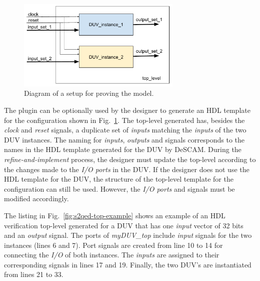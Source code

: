 \begin{figure}[htb!]
	\centering
	\includegraphics[width=0.7\textwidth]{images/top_s2qed.pdf}
	\caption{Diagram of a setup for proving the \SSQED{} model.}
	\label{fig:s2qed-top-diagram}
\end{figure}

The plugin can be optionally used by the designer to generate an HDL template for the configuration shown in Fig.~\ref{fig:s2qed-top-diagram}. The top-level generated has, besides the \textit{clock} and \textit{reset} signals, a duplicate set of \textit{inputs} matching the \textit{inputs} of the two DUV instances. The naming for \textit{inputs}, \textit{outputs} and signals corresponds to the names in the HDL template generated for the DUV by DeSCAM. During the \textit{refine-and-implement} process, the designer must update the top-level according to the changes made to the \textit{I/O ports} in the DUV. If the designer does not use the HDL template for the DUV, the structure of the top-level template for the \SSQED{} configuration can still be used. However, the \textit{I/O ports} and signals must be modified accordingly.

The listing in Fig.~\ref{fig:s2qed-top-example} shows an example of an HDL verification top-level generated for a DUV that has one \textit{input} vector of 32 bits and an \textit{output} signal. The ports of \textit{myDUV\_top} include \textit{input} signals for the two instances (lines 6 and 7). Port signals are created from line 10 to 14 for connecting the \textit{I/O} of both instances. The \textit{inputs} are assigned to their corresponding signals in lines 17 and 19.  Finally, the two DUV’s are instantiated from lines 21 to 33.

